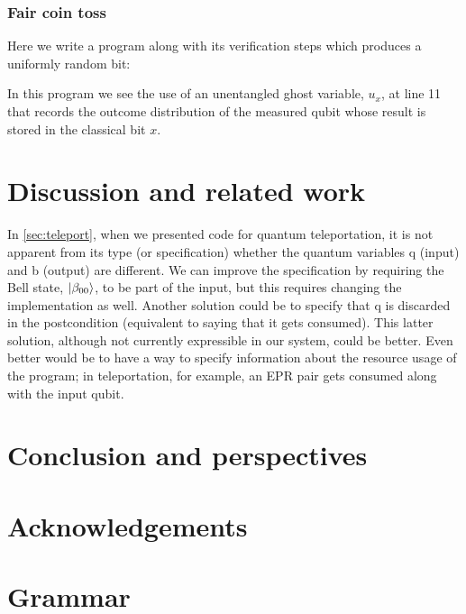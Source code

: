 \documentclass[adraft,creativecommons]{eptcs}
\theoremstyle{definition}
\theoremstyle{remark}
\begin{document}
\subsubsection{Fair coin toss}

Here we write a program along with its verification steps which produces a uniformly random bit:



In this program we see the use of an unentangled ghost variable, $u_x$, at line 11 that records the outcome distribution of the measured qubit whose result is stored in the classical bit $x$.

\section{Discussion and related work}

In \cref{sec:teleport}, when we presented code for quantum teleportation, it is not apparent from its type (or specification) whether the quantum variables q (input) and b (output) are different. We can improve the specification by requiring the Bell state, $\ket{\beta_{00}}$, to be part of the input, but this requires changing the implementation as well. Another solution could be to specify that q is discarded in the postcondition (equivalent to saying that it gets consumed). This latter solution, although not currently expressible in our system, could be better. Even better would be to have a way to specify information about the resource usage of the program; in teleportation, for example, an EPR pair gets consumed along with the input qubit.

\section{Conclusion and perspectives}

\blindtext

\section*{Acknowledgements}
\blindtext




\appendix

\section{Grammar}
\end{document}
